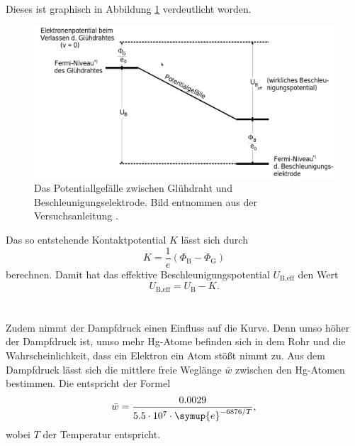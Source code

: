 Dieses ist graphisch in Abbildung \ref{fig:potential} verdeutlicht worden.
\begin{figure}
    \centering
    \includegraphics[width=\textwidth]{content/data/Potentialgefaelle.png}
    \caption{Das Potentiallgefälle zwischen Glühdraht und Beschleunigungselektrode. Bild entnommen aus der Versuchsanleitung \cite[5]{anleitung}.}
    \label{fig:potential}
\end{figure}
Das so entstehende Kontaktpotential $K$ lässt sich durch 
\begin{equation}
    K = \frac{1}{e} \left ( \Phi_\text{B} - \Phi_\text{G} \right)
    \label{eq:kontaktpotential}
\end{equation}
berechnen.
Damit hat das effektive Beschleunigungspotential $U_\text{B,eff}$ den Wert
\begin{equation}
    U_\text{B,eff} = U_\text{B} - K.
    \label{eq:beschleunigungeffektiv}
\end{equation}
\\\\
Zudem nimmt der Dampfdruck einen Einfluss auf die Kurve.
Denn umso höher der Dampfdruck ist, umso mehr Hg-Atome befinden sich in dem Rohr und die Wahrscheinlichkeit, dass ein Elektron ein Atom stößt nimmt zu.
Aus dem Dampfdruck lässt sich die mittlere freie Weglänge $\bar{w}$ zwischen den Hg-Atomen bestimmen.
Die entspricht der Formel
\begin{equation}
    \bar{w} = \frac{0.0029}{5.5\cdot10^7 \cdot \symup{e}^{-6876/T} },
    \label{eqn:weglaenge}
\end{equation}
wobei $T$ der Temperatur entspricht.